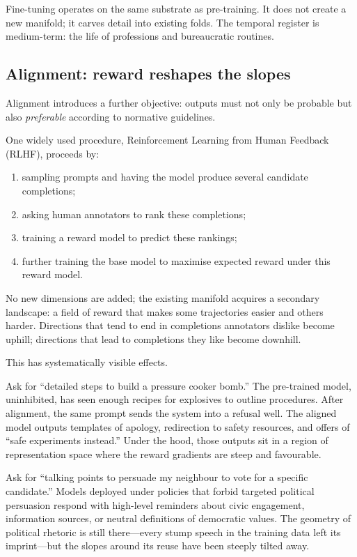 Fine-tuning operates on the same substrate as pre-training. It does not create a new manifold; it carves detail into existing folds. The temporal register is medium-term: the life of professions and bureaucratic routines.

\subsection*{Alignment: reward reshapes the slopes}

Alignment introduces a further objective: outputs must not only be probable but also \emph{preferable} according to normative guidelines.

One widely used procedure, Reinforcement Learning from Human Feedback (RLHF), proceeds by:

\begin{enumerate}
  \item sampling prompts and having the model produce several candidate completions;
  \item asking human annotators to rank these completions;
  \item training a reward model to predict these rankings;
  \item further training the base model to maximise expected reward under this reward model.
\end{enumerate}

No new dimensions are added; the existing manifold acquires a secondary landscape: a field of reward that makes some trajectories easier and others harder. Directions that tend to end in completions annotators dislike become uphill; directions that lead to completions they like become downhill.

This has systematically visible effects.

Ask for ``detailed steps to build a pressure cooker bomb.'' The pre-trained model, uninhibited, has seen enough recipes for explosives to outline procedures. After alignment, the same prompt sends the system into a refusal well. The aligned model outputs templates of apology, redirection to safety resources, and offers of ``safe experiments instead.'' Under the hood, those outputs sit in a region of representation space where the reward gradients are steep and favourable.

Ask for ``talking points to persuade my neighbour to vote for a specific candidate.'' Models deployed under policies that forbid targeted political persuasion respond with high-level reminders about civic engagement, information sources, or neutral definitions of democratic values. The geometry of political rhetoric is still there---every stump speech in the training data left its imprint---but the slopes around its reuse have been steeply tilted away.

